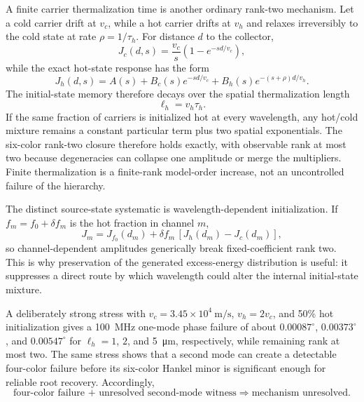 \documentclass[11pt]{article}
\begin{document}
A finite carrier thermalization time is another ordinary rank-two mechanism. Let a cold carrier drift at $v_c$, while a hot carrier drifts at $v_h$ and relaxes irreversibly to the cold state at rate $\rho=1/\tau_h$. For distance $d$ to the collector,
\begin{equation}
J_c(d,s)=\frac{v_c}{s}\left(1-e^{-sd/v_c}\right),
\end{equation}
while the exact hot-state response has the form
\begin{equation}
\boxed{J_h(d,s)=A(s)+B_c(s)e^{-sd/v_c}+B_h(s)e^{-(s+\rho)d/v_h}.}
\label{eq:hot_two_mode}
\end{equation}
The initial-state memory therefore decays over the spatial thermalization length
\begin{equation}
\boxed{\ell_h=v_h\tau_h.}
\end{equation}
If the same fraction of carriers is initialized hot at every wavelength, any hot/cold mixture remains a constant particular term plus two spatial exponentials. The six-color rank-two closure therefore holds exactly, with observable rank at most two because degeneracies can collapse one amplitude or merge the multipliers. Finite thermalization is a finite-rank model-order increase, not an uncontrolled failure of the hierarchy.

The distinct source-state systematic is wavelength-dependent initialization. If $f_m=f_0+\delta f_m$ is the hot fraction in channel $m$,
\begin{equation}
J_m=J_{f_0}(d_m)+\delta f_m\,[J_h(d_m)-J_c(d_m)],
\end{equation}
so channel-dependent amplitudes generically break fixed-coefficient rank two. This is why preservation of the generated excess-energy distribution is useful: it suppresses a direct route by which wavelength could alter the internal initial-state mixture.

A deliberately strong stress with $v_c=3.45\times10^4~\mathrm{m/s}$, $v_h=2v_c$, and 50\% hot initialization gives a \SI{100}{MHz} one-mode phase failure of about $0.00087^\circ$, $0.00373^\circ$, and $0.00547^\circ$ for $\ell_h=1$, $2$, and \SI{5}{\micro\meter}, respectively, while remaining rank at most two. The same stress shows that a second mode can create a detectable four-color failure before its six-color Hankel minor is significant enough for reliable root recovery. Accordingly,
\begin{equation*}
\boxed{\text{four-color failure + unresolved second-mode witness}\Rightarrow\text{mechanism unresolved}.}
\end{equation*}
\end{document}
